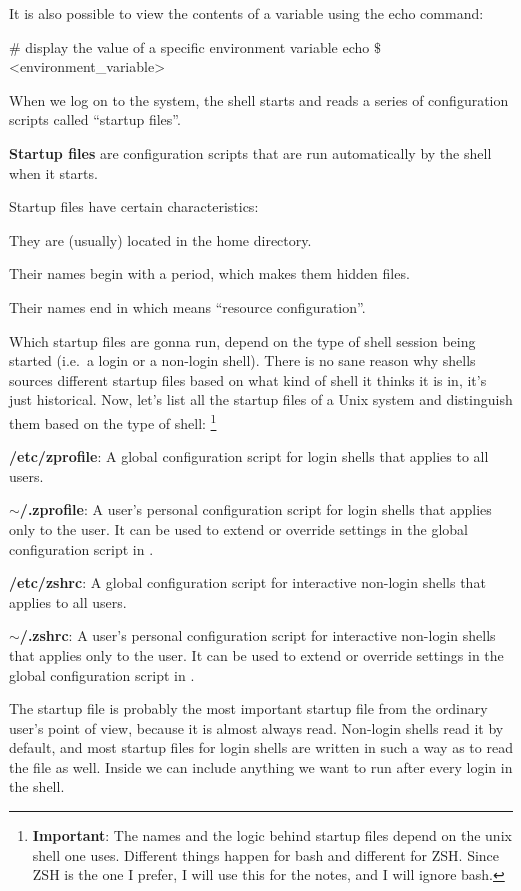 It is also possible to view the contents of a variable using the echo command:
\begin{bash}
# display the value of a specific environment variable
echo $\$$<environment_variable>
\end{bash}

When we log on to the system, the shell starts and reads a series of configuration scripts called ``startup files''.

\textbf{Startup files} are configuration scripts that are run automatically by the shell when it starts.
\ed

Startup files have certain characteristics:
\bit
\item They are (usually) located in the home directory.
\item Their names begin with a period, which makes them hidden files.
\item Their names end in  which means ``resource configuration''.
\eit

Which startup files are gonna run, depend on the type of shell session being started (i.e.\ a login or a non-login
shell). There is no sane reason why shells sources different startup files based on what kind of shell it thinks it
is in, it's just historical. Now, let's list all the startup files of a Unix system and distinguish them based on the
type of shell: \footnote{\textbf{Important}: The names and the logic behind startup files depend on the unix shell
one uses. Different things happen for bash and different for ZSH. Since ZSH is the one I prefer, I will use this for
the notes, and I will ignore bash.}
\bit
\item \textbf{/etc/zprofile}: A global configuration script for login shells that applies to all users.
\item \textbf{$\sim$/.zprofile}: A user's personal configuration script for login shells that applies only to the user.
It
can be used to extend or override settings in the global configuration script in .
\item \textbf{/etc/zshrc}: A global configuration script for interactive non-login shells that applies to all users.
\item \textbf{$\sim$/.zshrc}: A user's personal configuration script for interactive non-login shells that applies only
to
the user. It can be used to extend or override settings in the global configuration script in .
\eit

The  startup file is probably the most important startup file from the ordinary user's point of
view,
because it is almost always read. Non-login shells read it by default, and most startup files for login shells are
written in such a way as to read the  file as well. Inside  we can include
anything we
want to run after every login in the shell.

